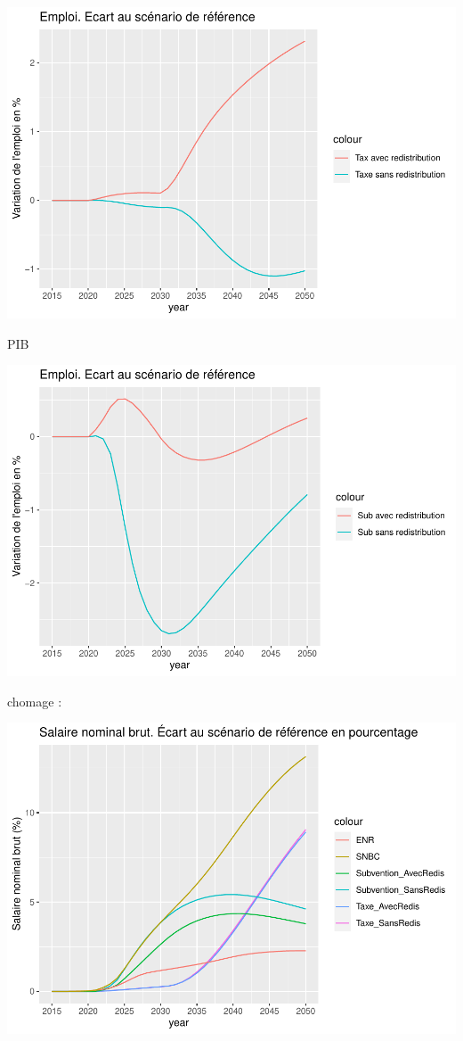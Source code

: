 \documentclass[
]{article}
\begin{document}
\includegraphics{Modele-ThreeMe-Tunisie_Sequeira_Valilou_Wang_files/figure-latex/unnamed-chunk-10-1.pdf}

PIB

\includegraphics{Modele-ThreeMe-Tunisie_Sequeira_Valilou_Wang_files/figure-latex/unnamed-chunk-11-1.pdf}

chomage :

\includegraphics{Modele-ThreeMe-Tunisie_Sequeira_Valilou_Wang_files/figure-latex/unnamed-chunk-12-1.pdf}
\end{document}
